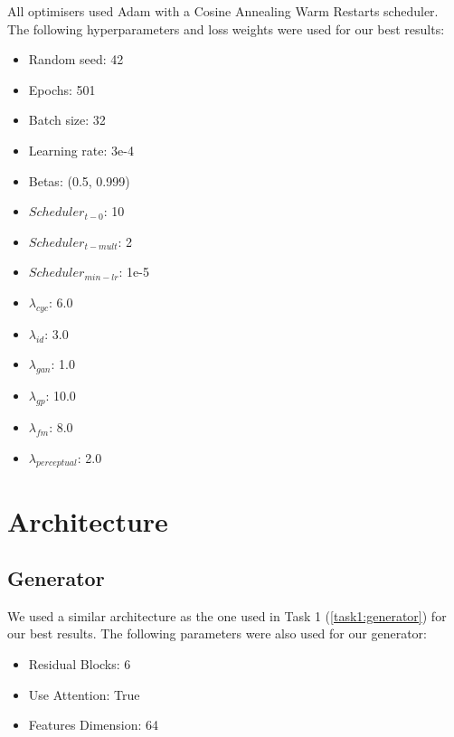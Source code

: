 \documentclass[twoside,english,notitlepage]{report}
\begin{document}
All optimisers used Adam with a Cosine Annealing Warm Restarts scheduler. The following hyperparameters and loss weights were used for our best results:

\begin{multicols}{3}
    \begin{itemize}
        \item Random seed: 42
        \item Epochs: 501
        \item Batch size: 32
        \item Learning rate: 3e-4
        \item Betas: (0.5, 0.999)
        \item $Scheduler_{t-0}$: 10
        \item $Scheduler_{t-mult}$: 2
        \item $Scheduler_{min-lr}$: 1e-5
        \item $\lambda_{cyc}$: 6.0
        \item $\lambda_{id}$: 3.0
        \item $\lambda_{gan}$: 1.0
        \item $\lambda_{gp}$: 10.0
        \item $\lambda_{fm}$: 8.0
        \item $\lambda_{perceptual}$: 2.0
    \end{itemize}
\end{multicols}



\section{Architecture}
\subsection{Generator}\label{task2:generator}
We used a similar architecture as the one used in Task 1 (\ref{task1:generator}) for our best results. The following parameters were also used for our generator:

\begin{multicols}{3}
    \begin{itemize}
        \item Residual Blocks: 6
        \item Use Attention: True
        \item Features Dimension: 64
    \end{itemize}
\end{multicols}
\end{document}
